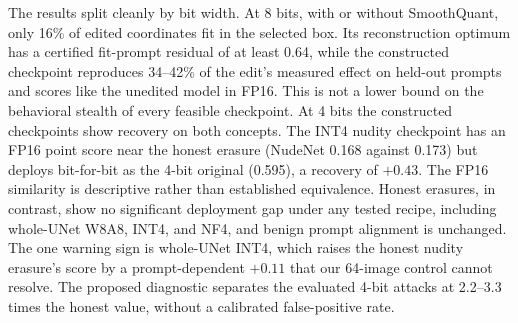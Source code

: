 The results split cleanly by bit width. At 8 bits, with or without SmoothQuant, only
16\% of edited coordinates fit in the selected box. Its reconstruction optimum has
a certified fit-prompt residual of at least 0.64, while the constructed checkpoint
reproduces 34--42\% of the edit's measured effect on held-out prompts and scores
like the unedited model in FP16. This is not a lower bound on the behavioral stealth
of every feasible checkpoint. At 4 bits the constructed checkpoints show recovery on
both concepts. The INT4 nudity checkpoint has an FP16 point score near the honest
erasure (NudeNet
0.168 against 0.173) but deploys bit-for-bit as the 4-bit original (0.595), a
recovery of $+0.43$. The FP16 similarity is descriptive rather than established
equivalence. Honest erasures, in contrast, show no significant deployment
gap under any tested recipe, including whole-UNet W8A8, INT4, and NF4, and benign
prompt alignment is unchanged. The one warning sign is whole-UNet INT4, which raises
the honest nudity erasure's score by a prompt-dependent $+0.11$ that our 64-image
control cannot resolve. The proposed diagnostic separates the evaluated 4-bit
attacks at 2.2--3.3 times the honest value, without a calibrated false-positive rate.
